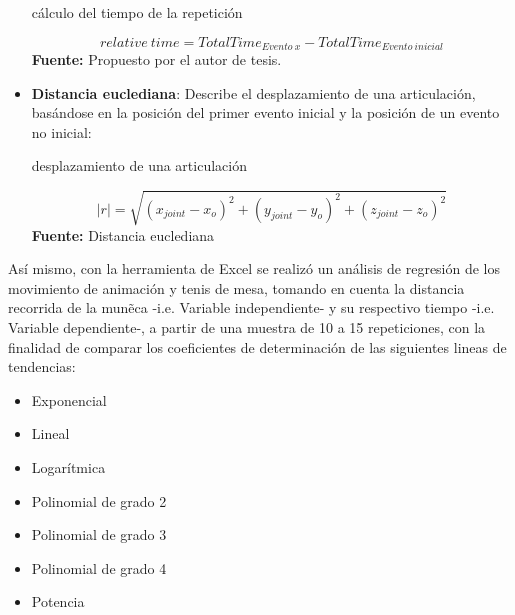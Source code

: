 \begin{itemize}
\begin{formula}[H]
	\centering
	\caption{c\'alculo del tiempo de la repetici\'on}
	\label{frm:relativeTime}
	\begin{equation}
	relative \: time = TotalTime_{Evento\: x}-TotalTime_{Evento\: inicial}
	\end{equation}
		\textbf{Fuente:} Propuesto por el autor de tesis.
\end{formula}
\item \textbf{Distancia euclediana}: Describe el desplazamiento de una articulaci\'on, bas\'andose en la posici\'on del primer evento inicial y la posici\'on de un evento no inicial:
\begin{formula}[H]
	\centering
	\caption{desplazamiento de una articulaci\'on}
	\label{frm:desplazaUser}
	\begin{equation}
|r|=\sqrt{(x_{joint}-x_{o})^{2}+(y_{joint}-y_{o})^{2}+(z_{joint}-z_{o})^{2}}
	\end{equation}
	\textbf{Fuente:} Distancia euclediana \cite[p.~423]{ayres2001calculo}
\end{formula}  
\end{itemize}
As\'i mismo, con la herramienta de Excel se realiz\'o un an\'alisis de regresi\'on  de los movimiento de animaci\'on y tenis de mesa, tomando en cuenta  la distancia recorrida de la mun\~eca -i.e. Variable independiente- y su respectivo tiempo -i.e. Variable dependiente-, a partir de una muestra de 10 a 15 repeticiones, con la finalidad de comparar los coeficientes de determinaci\'on de las siguientes lineas de tendencias:
\begin{itemize}
\item Exponencial
\item Lineal
\item Logar\'itmica
\item Polinomial de grado 2
\item Polinomial de grado 3
\item Polinomial de grado 4
\item Potencia
\end{itemize}
